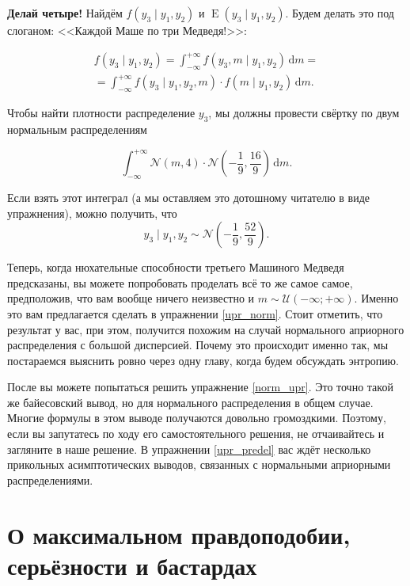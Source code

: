 \documentclass[12pt, a4paper, oneside]{extreport}
\DeclareMathOperator{\E}{\mathop{E}}
\def \mN{\mathcal{N}}
\def \mU{\mathcal{U}}
\newcommand{\dx}[1]{\,\mathrm{d}#1} %
\theoremstyle{plain}              %
\theoremstyle{definition}         %
\begin{document}
\textbf{Делай четыре!} Найдём $f(y_3 \mid y_1,y_2)$ и $\E(y_3 \mid y_1,y_2)$. Будем делать это под слоганом: <<Каждой Маше по три Медведя!>>:


\begin{multline*}
 f(y_3 \mid y_1,y_2)  = \int_{-\infty}^{+\infty} f(y_3, m \mid y_1,y_2)\dx{m} = \\ = \int_{-\infty}^{+\infty}  f(y_3 \mid y_1,y_2,m) \cdot f(m \mid y_1,y_2) \dx{m}.
\end{multline*}

Чтобы найти плотности распределение $y_3$, мы должны провести свёртку по двум нормальным распределениям

\[ \int_{-\infty}^{+\infty} \mN(m,4)\cdot \mN \left (-\frac{1}{9},\frac{16}{9} \right)\dx{m}.\]  

Если взять этот интеграл (а мы оставляем это дотошному читателю в виде упражнения),  можно получить, что \[y_3 \mid y_1,y_2 \sim \mN \left(-\frac{1}{9},\frac{52}{9} \right).\]

Теперь, когда нюхательные способности третьего Машиного Медведя предсказаны, вы можете попробовать проделать всё то же самое самое, предположив, что вам вообще ничего неизвестно и $m \sim \mU(-\infty; +\infty)$. Именно это вам предлагается сделать в упражнении \ref{upr_norm}. Стоит отметить, что результат у вас, при этом, получится похожим на случай нормального априорного распределения с большой дисперсией. Почему это происходит именно так, мы постараемся выяснить ровно через одну главу, когда будем обсуждать энтропию.

После вы можете попытаться решить упражнение \ref{norm_upr}. Это точно такой же байесовский вывод, но для нормального распределения в общем случае. Многие формулы в этом выводе получаются довольно громоздкими. Поэтому, если вы запутатесь по ходу его самостоятельного решения, не отчаивайтесь и загляните в наше решение. В упражнении \ref{upr_predel} вас ждёт несколько прикольных асимптотических выводов, связанных с нормальными априорными распределениями. 



\section{О максимальном правдоподобии, серьёзности и бастардах}

\end{document}
